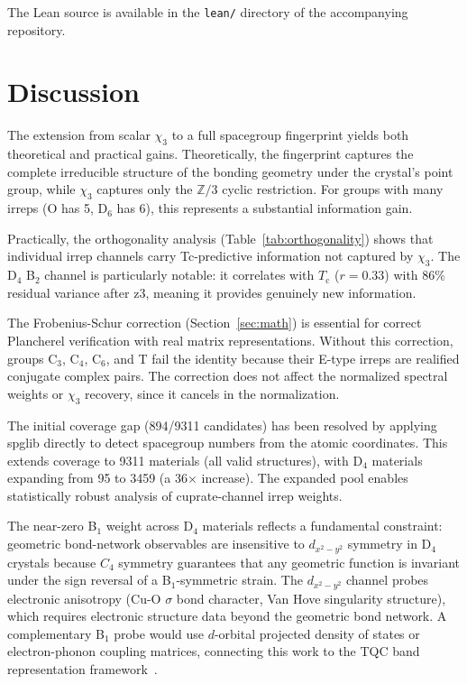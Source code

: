 \documentclass[aps,prb,twocolumn,superscriptaddress]{revtex4-2}
\newcommand{\ZZ}{\mathbb{Z}}
\newcommand{\Tc}{T_{\mathrm{c}}}
\begin{document}
The Lean source is available in the \texttt{lean/} directory of the
accompanying repository.

\section{Discussion}
\label{sec:discussion}

The extension from scalar $\chi_3$ to a full spacegroup fingerprint
yields both theoretical and practical gains. Theoretically, the
fingerprint captures the complete irreducible structure of the
bonding geometry under the crystal's point group, while $\chi_3$
captures only the $\ZZ/3$ cyclic restriction. For groups with many
irreps (O has 5, D$_6$ has 6), this represents a substantial
information gain.

Practically, the orthogonality analysis (Table~\ref{tab:orthogonality})
shows that individual irrep channels carry Tc-predictive information
not captured by $\chi_3$. The D$_4$ B$_2$ channel is particularly
notable: it correlates with $\Tc$ ($r = 0.33$) with 86\% residual
variance after z3, meaning it provides genuinely new information.

The Frobenius-Schur correction (Section~\ref{sec:math}) is essential
for correct Plancherel verification with real matrix representations.
Without this correction, groups C$_3$, C$_4$, C$_6$, and T fail
the identity because their E-type irreps are realified conjugate
complex pairs. The correction does not affect the normalized spectral
weights or $\chi_3$ recovery, since it cancels in the normalization.

The initial coverage gap (894/9311 candidates) has been resolved
by applying spglib directly to detect spacegroup numbers from the
atomic coordinates. This extends coverage to 9311 materials (all
valid structures), with D$_4$ materials expanding from 95 to 3459
(a 36$\times$ increase). The expanded pool enables statistically
robust analysis of cuprate-channel irrep weights.

The near-zero B$_1$ weight across D$_4$ materials reflects a
fundamental constraint: geometric bond-network observables are
insensitive to $d_{x^2-y^2}$ symmetry in D$_4$ crystals because
$C_4$ symmetry guarantees that any geometric function is invariant
under the sign reversal of a B$_1$-symmetric strain. The $d_{x^2-y^2}$
channel probes electronic anisotropy (Cu-O $\sigma$ bond character,
Van Hove singularity structure), which requires electronic structure
data beyond the geometric bond network. A complementary B$_1$ probe
would use $d$-orbital projected density of states or electron-phonon
coupling matrices, connecting this work to the TQC band representation
framework~\cite{bradlyn2017tqc}.
\end{document}
